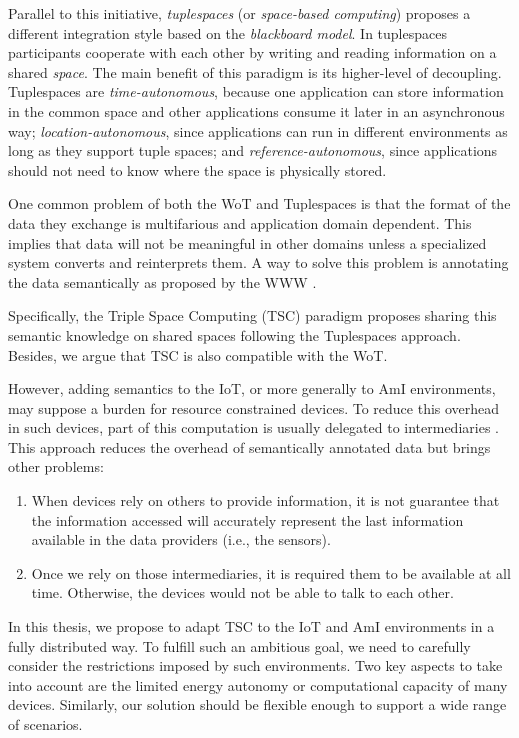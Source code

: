 Parallel to this initiative, \emph{tuplespaces} (or \emph{space-based computing}) \cite{gelernter_generative_1985} proposes a different integration style based on the \emph{blackboard model}.
In tuplespaces participants cooperate with each other by writing and reading information on a shared \emph{space}.
The main benefit of this paradigm is its higher-level of decoupling.
Tuplespaces are
\emph{time-autonomous}, because one application can store information in the common space and other applications consume it later in an asynchronous way;
\emph{location-autonomous}, since applications can run in different environments as long as they support tuple spaces;
and \emph{reference-autonomous}, since applications should not need to know where the space is physically stored.

\medskip

One common problem of both the WoT and Tuplespaces is that the format of the data they exchange is multifarious and application domain dependent.
This implies that data will not be meaningful in other domains unless a specialized system converts and reinterprets them.
A way to solve this problem is annotating the data semantically as proposed by the WWW \cite{berners-lee_semantic_2001}.

Specifically, the Triple Space Computing (TSC) paradigm proposes sharing this semantic knowledge on shared spaces following the Tuplespaces approach.
Besides, we argue that TSC is also compatible with the WoT.

However, adding semantics to the IoT, or more generally to AmI environments, may suppose a burden for resource constrained devices.
To reduce this overhead in such devices, part of this computation is usually delegated to intermediaries \cite{honkola_smart-m3_2010}. %
This approach reduces the overhead of semantically annotated data but brings other problems:
\begin{enumerate}
 \item When devices rely on others to provide information, it is not guarantee that the information accessed will accurately represent the last information available in the data providers (i.e., the sensors).
 \item Once we rely on those intermediaries, it is required them to be available at all time. Otherwise, the devices would not be able to talk to each other.
\end{enumerate}

In this thesis, we propose to adapt TSC to the IoT and AmI environments in a fully distributed way.
To fulfill such an ambitious goal, we need to carefully consider the restrictions imposed by such environments.
Two key aspects to take into account are the limited energy autonomy or computational capacity of many devices.
Similarly, our solution should be flexible enough to support a wide range of scenarios.

